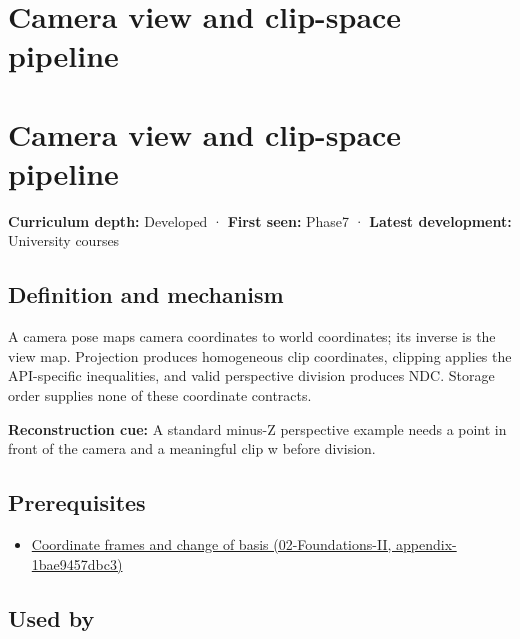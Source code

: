 \hypertarget{appendix-1c07d64f5e70}{}
\section*{Camera view and clip-space pipeline}
\section{Camera view and clip-space pipeline}\label{appendix-1c07d64f5e70-camera-view-and-clip-space-pipeline}

\textbf{Curriculum depth:} Developed · \textbf{First seen:} Phase7 · \textbf{Latest development:} University courses

\subsection{Definition and mechanism}\label{appendix-1c07d64f5e70-definition-and-mechanism}

A camera pose maps camera coordinates to world coordinates; its inverse is the view map. Projection produces homogeneous clip coordinates, clipping applies the API-specific inequalities, and valid perspective division produces NDC. Storage order supplies none of these coordinate contracts.

\textbf{Reconstruction cue:} A standard minus-Z perspective example needs a point in front of the camera and a meaningful clip w before division.

\subsection{Prerequisites}\label{appendix-1c07d64f5e70-prerequisites}

\begin{itemize}
\tightlist
\item
  \href{../02-Foundations-II/main.pdf\#nameddest=appendix-1bae9457dbc3}{Coordinate frames and change of basis (02-Foundations-II, appendix-1bae9457dbc3)}
\end{itemize}

\subsection{Used by}\label{appendix-1c07d64f5e70-used-by}

